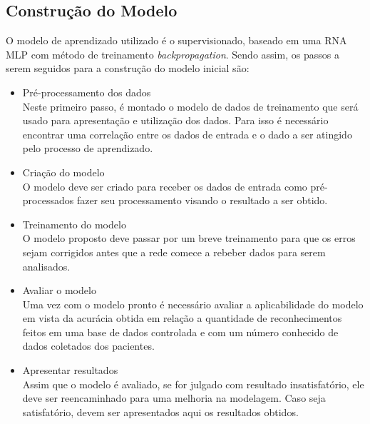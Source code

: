     \subsection{Construção do Modelo}

        O modelo de aprendizado utilizado é o supervisionado, baseado em uma RNA MLP com método de treinamento \textit{backpropagation}.
        Sendo assim, os passos a serem seguidos para a construção do modelo inicial são:

        \begin{itemize}
            \item Pré-processamento dos dados \\ Neste primeiro passo, é montado o modelo de dados de treinamento que será usado para apresentação e utilização dos dados. Para isso é necessário encontrar uma correlação entre os dados de entrada e o dado a ser atingido pelo processo de aprendizado.

            \item Criação do modelo \\ O modelo deve ser criado para receber os dados de entrada como pré-processados fazer seu processamento visando o resultado a ser obtido.

            \item Treinamento do modelo \\ O modelo proposto deve passar por um breve treinamento para que os erros sejam corrigidos antes que a rede comece a rebeber dados para serem analisados.

            \item Avaliar o modelo \\ Uma vez com o modelo pronto é necessário avaliar a aplicabilidade do modelo em vista da acurácia obtida em relação a quantidade de reconhecimentos feitos em uma base de dados controlada e com um número conhecido de dados coletados dos pacientes.

            \item Apresentar resultados \\ Assim que o modelo é avaliado, se for julgado com resultado insatisfatório, ele deve ser reencaminhado para uma melhoria na modelagem. Caso seja satisfatório, devem ser apresentados aqui os resultados obtidos.
        \end{itemize}
